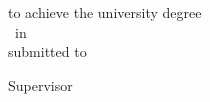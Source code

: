 
\begin{titlepage}

\large  %

\begin{center}
~
\vfill\vfill\vfill

\sffamily


\myauthor

\vfill


{\Huge\bfseries\textcolor{DispositionColor}{\mytitle}}

\vfill\vfill\vfill\vfill

{\bfseries\myworktitle}\\
\vfill
to achieve the university degree\\
{\mygrade\ in \mystudy}\\
\vfill
submitted to\\
{\bfseries\myuniversity}

\vfill\vfill\vfill
\vfill\vfill\vfill

Supervisor\\
\mysupervisor\\
\vfill
\vfill
\vfill
\myinstitute\\
\vfill

\vfill\vfill\vfill

{\normalsize\mysubmissionmonth~\mysubmissionyear}

\end{center}
\end{titlepage}

\newpage
